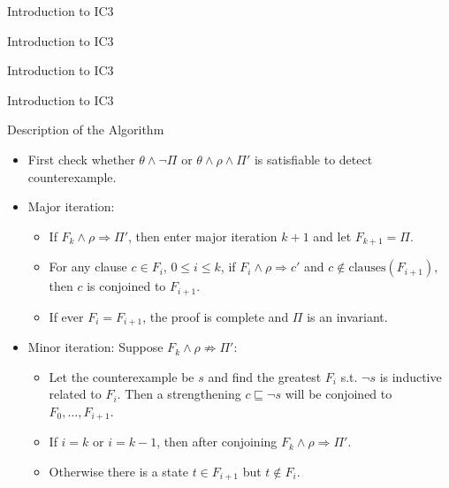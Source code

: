 \documentclass[aspectratio=1610, 13pt]{beamer}
\begin{document}
\begin{frame}{Introduction to IC3}

\end{frame}
\begin{frame}{Introduction to IC3}

\end{frame}
\begin{frame}{Introduction to IC3}

\end{frame}
\begin{frame}{Introduction to IC3}

\end{frame}


\begin{frame}{Description of the Algorithm}



\begin{itemize}
\item First check whether $\theta \wedge \neg \Pi$ or $\theta \wedge \rho \wedge \Pi'$ is satisfiable to detect counterexample.

\item Major iteration: 

\begin{itemize}

\item If $F_k \wedge \rho \Rightarrow \Pi'$, then enter major iteration $k + 1$ and let $F_{k + 1} = \Pi$.

\item For any clause $c\in F_i$, $0 \le i \le k$, if $F_i \wedge \rho \Rightarrow c'$ and $c \not\in \text{clauses}(F_{i+1})$, then $c$ is conjoined to $F_{i + 1}$.

\item If ever $F_i = F_{i + 1}$, the proof is complete and  $\Pi$ is an invariant.
\end{itemize}
\item Minor iteration: Suppose $F_k\wedge \rho \not\Rightarrow \Pi'$:

\begin{itemize}
\item Let the counterexample be $s$ and find the greatest $F_i$ s.t. $\neg s$ is inductive related to $F_{i}$. Then a strengthening $c \sqsubseteq \neg s$ will be conjoined to $F_0, \ldots, F_{i + 1}$. 

\item If $i = k$ or $i = k - 1$, then after conjoining $F_k \wedge \rho \Rightarrow \Pi'$.
\item Otherwise there is a state $t\in F_{i + 1}$ but $t\not\in F_{i}$.




\end{itemize}
\end{itemize}
\end{frame}
\end{document}

